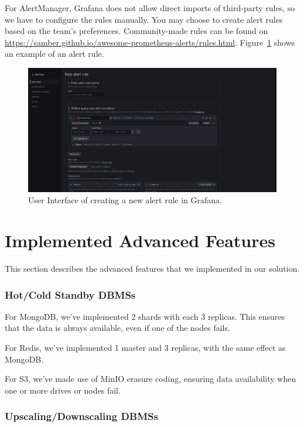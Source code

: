 \documentclass{report}
\begin{document}
    For AlertManager, Grafana does not allow direct imports of third-party rules, so we have to configure the rules manually. You may choose to create alert rules based on the team's preferences. Community-made rules can be found on \url{https://samber.github.io/awesome-prometheus-alerts/rules.html}. Figure~\ref{fig:alerting-create} shows an example of an alert rule.

    \begin{figure}[h]
        \centering
        \includegraphics[width=\textwidth]{images/alerting-create}
        \caption{User Interface of creating a new alert rule in Grafana.}
        \label{fig:alerting-create}
    \end{figure}

    \section{Implemented Advanced Features}\label{sec:advanced-requirements}
    This section describes the advanced features that we implemented in our solution.
    \subsubsection{Hot/Cold Standby DBMSs}
    For MongoDB, we've implemented 2 shards with each 3 replicas. This ensures that the data is always available, even if one of the nodes fails.

    For Redis, we've implemented 1 master and 3 replicas, with the same effect as MongoDB.

    For S3, we've made use of MinIO erasure coding, ensuring data availability when one or more drives or nodes fail.

    \subsubsection{Upscaling/Downscaling DBMSs}
\end{document}

